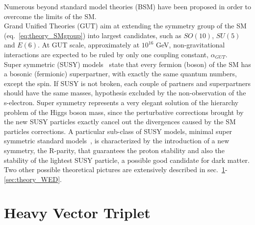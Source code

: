 \noindent Numerous beyond standard model theories (BSM) have been proposed in order to overcome the limits of the SM.\\
Grand Unified Theories (GUT) aim at extending the symmetry group of the SM (eq.~\ref{eq:theory_SMgroup}) into largest candidates, such as $SO(10)$, $SU(5)$ and $E(6)$. At GUT scale, approximately at $10^{16}$ GeV, non-gravitational interactions are expected to be ruled by only one coupling constant, $\alpha_{GUT}$.\\%
Super symmetric (SUSY) models~\cite{Martin:1997ns} state that every fermion (boson) of the SM has a bosonic (fermionic) superpartner, with exactly the same quantum numbers, except the spin. If SUSY is not broken, each couple of partners and superpartners should have the same masses, hypothesis excluded by the non-observation of the s-electron. Super symmetry represents a very elegant solution of the hierarchy problem of the Higgs boson mass, since the perturbative corrections brought by the new SUSY particles exactly cancel out the divergences caused by the SM particles corrections. A particular sub-class of SUSY models, minimal super symmetric standard models~\cite{Csaki:1996ks,Castano:1993ri,Haber:1993wf}, is characterized by the introduction of a new symmetry, the R-parity, that guarantees the proton stability and also the stability of the lightest SUSY particle, a possible good candidate for dark matter.
\\

\noindent Two other possible theoretical pictures are extensively described in sec.~\ref{sec:theory_HVT}-\ref{sec:theory_WED}.

\newpage

\section{Heavy Vector Triplet}
\label{sec:theory_HVT}

